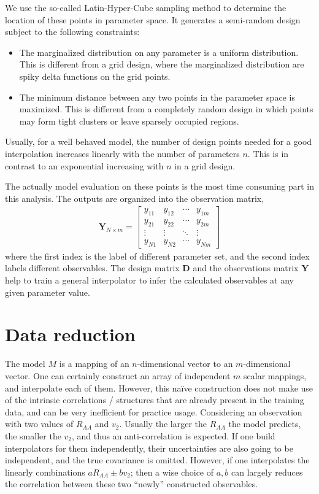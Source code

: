 We use the so-called Latin-Hyper-Cube sampling method to determine the location of these points in parameter space. 
It generates a semi-random design subject to the following constraints:
\begin{itemize}
\item The marginalized distribution on any parameter is a uniform distribution.
This is different from a grid design, where the marginalized distribution are spiky delta functions on the grid points.
\item The minimum distance between any two points in the parameter space is maximized.
This is different from a completely random design in which points may form tight clusters or leave sparsely occupied regions.
\end{itemize}
Usually, for a well behaved model, the number of design points needed for a good interpolation increases linearly with the number of parameters $n$. 
This is in contrast to an exponential increasing with $n$ in a grid design.

The actually model evaluation on these points is the most time consuming part in this analysis.
The outputs are organized into the observation matrix,
\begin{eqnarray}
\mathbf{Y}_{N\times m} = 
\begin{bmatrix}
y_{11} & y_{12} & \cdots & y_{1m}\\
y_{21} & y_{22} & \cdots & y_{2m}\\
\vdots & \vdots & \ddots & \vdots \\
y_{N1} & y_{N2} & \cdots & y_{Nm}
\end{bmatrix}
\end{eqnarray}
where the first index is the label of different parameter set, and the second index labels different observables.
The design matrix $\mathbf{D}$ and the observations matrix $\mathbf{Y}$ help to train a general interpolator to infer the calculated observables at any given parameter value.

\section{Data reduction}
The model $M$ is a mapping of an $n$-dimensional vector to an $m$-dimensional vector. 
One can certainly construct an array of independent $m$ scalar mappings, and interpolate each of them.
However, this na\"ive construction does not make use of the intrinsic correlations / structures that are already present in the training data, and can be very inefficient for practice usage.
Considering an observation with two values of $R_{AA}$ and $v_2$. Usually the larger the $R_{AA}$ the model predicts, the smaller the $v_2$, and thus an anti-correlation is expected.
If one build interpolators for them independently, their uncertainties are also going to be independent, and the true covariance is omitted.
However, if one interpolates the linearly combinations $a R_{AA} \pm b v_2$; then a wise choice of $a, b$ can largely reduces the correlation between these two ``newly'' constructed observables.

